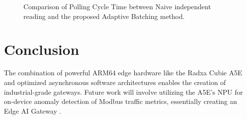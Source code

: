 \documentclass[journal]{IEEEtran}
\begin{document}
\begin{figure}[htbp]
\centering
{}
\caption{Comparison of Polling Cycle Time between Naive independent reading and the proposed Adaptive Batching method.}
\label{fig:cycle_time}
\end{figure}

\section{Conclusion}
The combination of powerful ARM64 edge hardware like the Radxa Cubie A5E and optimized asynchronous software architectures enables the creation of industrial-grade gateways. Future work will involve utilizing the A5E's NPU for on-device anomaly detection of Modbus traffic metrics, essentially creating an Edge AI Gateway \cite{edge_ai_gateway}.



\end{document}
